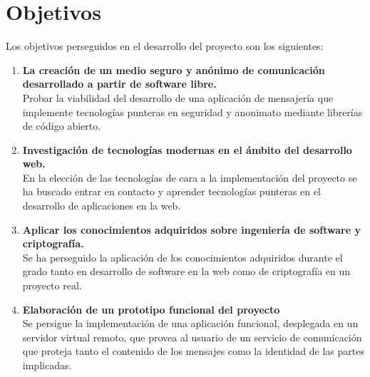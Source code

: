 \chapter{Objetivos}

Los objetivos perseguidos en el desarrollo del proyecto son los siguientes:

\begin{enumerate}  
	\item  \textbf{La creación de un medio seguro y anónimo de comunicación desarrollado a partir de software libre.} \\
			Probar la viabilidad del desarrollo de una aplicación de mensajería que implemente tecnologías punteras en seguridad y anonimato mediante librerías de código abierto.
			
	\item  \textbf{Investigación de tecnologías modernas en el ámbito del desarrollo web.} \\
			En la elección de las tecnologías de cara a la implementación del proyecto se ha buscado entrar en contacto y aprender tecnologías punteras en el desarrollo de aplicaciones en la web. 
			
	\item \textbf{Aplicar los conocimientos adquiridos sobre ingeniería de software y criptografía.} \\ 
			Se ha perseguido la aplicación de los conocimientos adquiridos durante el grado tanto en desarrollo de software en la web como de criptografía en un proyecto real.
						
	\item  \textbf{Elaboración de un prototipo funcional del proyecto} \\
			Se persigue la implementación de una aplicación funcional, desplegada en un servidor virtual remoto, que provea al usuario de un servicio de comunicación que proteja tanto el contenido de los mensajes como la identidad de las partes implicadas.
\end{enumerate}